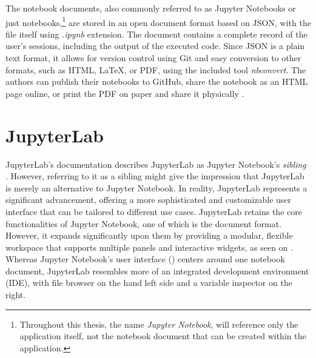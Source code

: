 \documentclass[
  digital,     %
  oneside,     %
  nosansbold,  %
  nocolorbold, %
  lof,         %
  nolot,         %
]{fithesis4}
\begin{document}
The notebook documents, also commonly referred to as Jupyter Notebooks or just notebooks,\footnote{Throughout this thesis, the name \emph{Jupyter Notebook}, will reference only the application itself, not the notebook document that can be created within the application.} are stored in an open document format based on JSON, with the file itself using \emph{.ipynb} extension. The document contains a complete record of the user's sessions, including the output of the executed code. Since JSON is a plain text format, it allows for version control using Git and easy conversion to other formats, such as HTML, LaTeX, or PDF, using the included tool \emph{nbconvert}. The authors can publish their notebooks to GitHub, share the notebook as an HTML page online, or print the PDF on paper and share it physically \cite{kluyver2016jupyter}. 


\section{JupyterLab}

JupyterLab's documentation describes JupyterLab as Jupyter Notebook's \emph{sibling} \cite{jupyter_lab}. However, referring to it as a sibling might give the impression that JupyterLab is merely an alternative to Jupyter Notebook. In reality, JupyterLab represents a significant advancement, offering a more sophisticated and customizable user interface that can be tailored to different use cases. JupyterLab retains the core functionalities of Jupyter Notebook, one of which is the document format. However, it expands significantly upon them by providing a modular, flexible workspace that supports multiple panels and interactive widgets, as seen on . Whereas Jupyter Notebook's user interface () centers around one notebook document, JupyterLab resembles more of an integrated development environment (IDE), with file browser on the hand left side and a variable inspector on the right.
\end{document}
